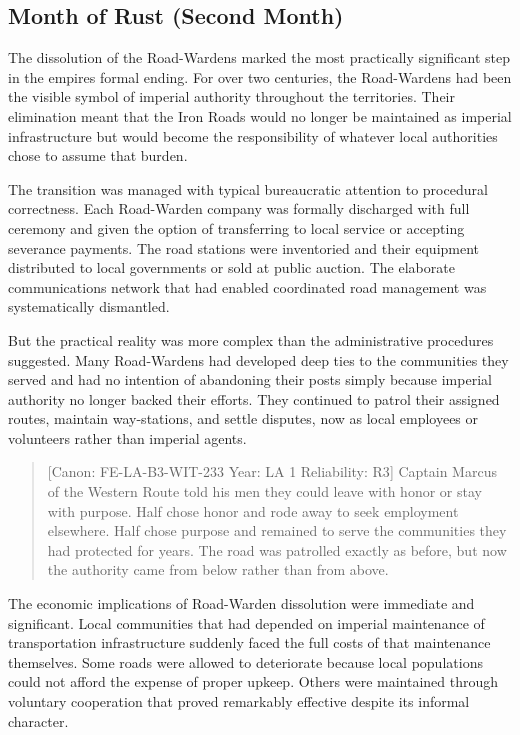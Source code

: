 \subsection{Month of Rust (Second
Month)}\label{month-of-rust-second-month}

The dissolution of the Road-Wardens marked the most practically
significant step in the empire\textquotesingle s formal ending. For over
two centuries, the Road-Wardens had been the visible symbol of imperial
authority throughout the territories. Their elimination meant that the
Iron Roads would no longer be maintained as imperial infrastructure but
would become the responsibility of whatever local authorities chose to
assume that burden.

The transition was managed with typical bureaucratic attention to
procedural correctness. Each Road-Warden company was formally discharged
with full ceremony and given the option of transferring to local service
or accepting severance payments. The road stations were inventoried and
their equipment distributed to local governments or sold at public
auction. The elaborate communications network that had enabled
coordinated road management was systematically dismantled.

But the practical reality was more complex than the administrative
procedures suggested. Many Road-Wardens had developed deep ties to the
communities they served and had no intention of abandoning their posts
simply because imperial authority no longer backed their efforts. They
continued to patrol their assigned routes, maintain way-stations, and
settle disputes, now as local employees or volunteers rather than
imperial agents.

\begin{quote}
{[}Canon: FE-LA-B3-WIT-233 \textbar{} Year: LA 1 \textbar{} Reliability:
R3{]} Captain Marcus of the Western Route told his men they could leave
with honor or stay with purpose. Half chose honor and rode away to seek
employment elsewhere. Half chose purpose and remained to serve the
communities they had protected for years. The road was patrolled exactly
as before, but now the authority came from below rather than from above.
\end{quote}

The economic implications of Road-Warden dissolution were immediate and
significant. Local communities that had depended on imperial maintenance
of transportation infrastructure suddenly faced the full costs of that
maintenance themselves. Some roads were allowed to deteriorate because
local populations could not afford the expense of proper upkeep. Others
were maintained through voluntary cooperation that proved remarkably
effective despite its informal character.

